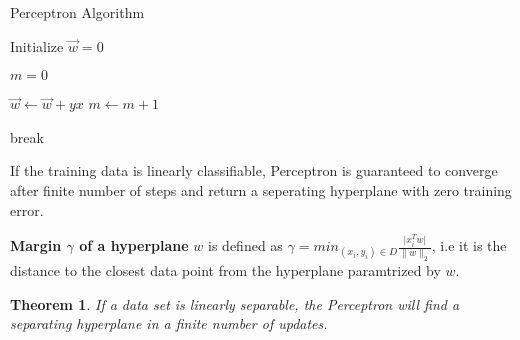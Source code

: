 \documentclass[12pt]{article}
\newtheorem*{thm}{Theorem}
\begin{document}
\begin{algorithm}
	
	\caption*{Perceptron Algorithm} \label{alg:MyAlgorithm}
	\begin{algorithmic}
		\STATE Initialize $\vec{w} = 0$
		
		\STATE $m=0$
		
		
		\STATE $\vec{w} \leftarrow \vec{w} + yx$
		\STATE $m \leftarrow m + 1$
		
		\ENDIF
		\ENDFOR
		
		\STATE break
		
		\ENDIF
		
		
		
		\ENDWHILE
		
	\end{algorithmic}
\end{algorithm}




 If the training data is linearly classifiable, Perceptron is guaranteed to converge after finite number of steps and return a seperating hyperplane with zero training error.
 

 
 \textbf{Margin $\gamma$ of a hyperplane} $w$ is defined as $\gamma = min_{(x_{i},y_{i})\in D}  \frac{ \vert x_{i}^{T}w \vert}{\|w\|_{2}}$, i.e it is the distance to the closest data point from the hyperplane paramtrized by $w$.
 
 
 
 \begin{thm}If a data set is linearly separable, the Perceptron will find a separating hyperplane in a finite number of updates.\end{thm}
 
\end{document}
